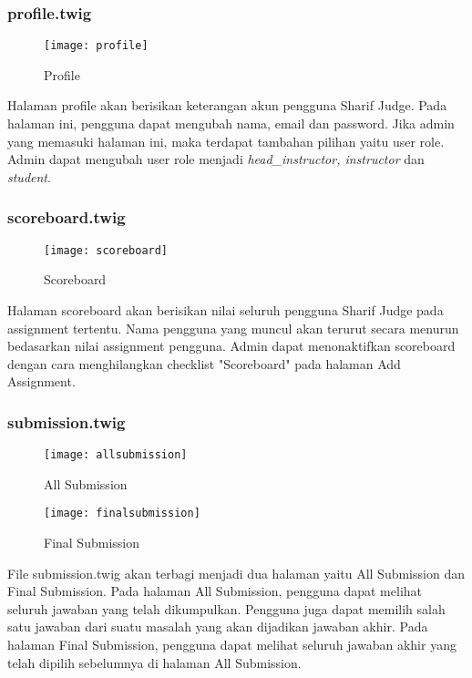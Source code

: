 \subsubsection{profile.twig}
\begin{figure}[H]
	\centering  
	\texttt{[image: profile]}  
	\caption[Profile]{Profile} 
	\label{fig:profile} 
\end{figure} 
Halaman profile akan berisikan keterangan akun pengguna Sharif Judge. Pada halaman ini, pengguna dapat mengubah nama, email dan password. Jika admin yang memasuki halaman ini, maka terdapat tambahan pilihan yaitu user role. Admin dapat mengubah user role menjadi \textit{head\_instructor, instructor} dan \textit{student}.

\subsubsection{scoreboard.twig}
\begin{figure}[H]
	\centering  
	\texttt{[image: scoreboard]}  
	\caption[Scoreboard]{Scoreboard} 
	\label{fig:scoreboard} 
\end{figure} 
Halaman scoreboard akan berisikan nilai seluruh pengguna Sharif Judge pada assignment tertentu. Nama pengguna yang muncul akan terurut secara menurun bedasarkan nilai assignment pengguna. Admin dapat menonaktifkan scoreboard dengan cara menghilangkan checklist "Scoreboard" pada halaman Add Assignment.

\subsubsection{submission.twig}
\begin{figure}[H]
	\centering  
	\texttt{[image: allsubmission]}  
	\caption[All Submission]{All Submission} 
	\label{fig:allsubmission} 
\end{figure} 

\begin{figure}[H]
	\centering  
	\texttt{[image: finalsubmission]}  
	\caption[Final Submission]{Final Submission} 
	\label{fig:finalsubmission} 
\end{figure} 

File submission.twig akan terbagi menjadi dua halaman yaitu All Submission dan Final Submission. Pada halaman All Submission, pengguna dapat melihat seluruh jawaban yang telah dikumpulkan. Pengguna juga dapat memilih salah satu jawaban dari suatu masalah yang akan dijadikan jawaban akhir. Pada halaman Final Submission, pengguna dapat melihat seluruh jawaban akhir yang telah dipilih sebelumnya di halaman All Submission.

